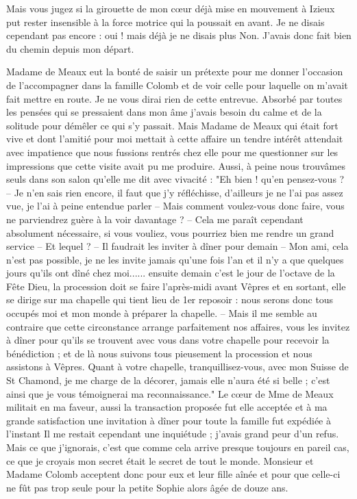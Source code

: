 \documentclass[11pt,a4paper]{report}
\begin{document}
Mais vous jugez si la girouette de mon cœur déjà mise en mouvement à Izieux put rester insensible à la force motrice qui la poussait en avant. Je ne disais cependant pas encore : oui ! mais déjà je ne disais plus Non. J'avais donc fait bien du chemin depuis mon départ.

Madame de Meaux eut la bonté de saisir un prétexte pour me donner l'occasion de l'accompagner dans la famille Colomb et de voir celle pour laquelle on m'avait fait mettre en route. Je ne vous dirai rien de cette entrevue. Absorbé par toutes les pensées qui se pressaient dans mon âme j'avais besoin du calme et de la solitude pour démêler ce qui s'y passait. Mais Madame de Meaux qui était fort vive et dont l'amitié pour moi mettait à cette affaire un tendre intérêt attendait avec impatience que nous fussions rentrés chez elle pour me questionner sur les impressions que cette visite avait pu me produire. Aussi, à peine nous trouvâmes seuls dans son salon qu'elle me dit avec vivacité : "Eh bien ! qu'en pensez-vous ? -- Je n'en sais rien encore, il faut que j'y réfléchisse, d'ailleurs je ne l'ai pas assez vue, je l'ai à peine entendue parler -- Mais comment voulez-vous donc faire, vous ne parviendrez guère à la voir davantage ? -- Cela me paraît cependant absolument nécessaire, si vous vouliez, vous pourriez bien me rendre un grand service -- Et lequel ? -- Il faudrait les inviter à dîner pour demain -- Mon ami, cela n'est pas possible, je ne les invite jamais qu'une fois l'an et il n'y a que quelques jours qu'ils ont dîné chez moi...... ensuite demain c'est le jour de l'octave de la Fête Dieu, la procession doit se faire l'après-midi avant Vêpres et en sortant, elle se dirige sur ma chapelle qui tient lieu de 1er reposoir : nous serons donc tous occupés moi et mon monde à préparer la chapelle. -- Mais il me semble au contraire que cette circonstance arrange parfaitement nos affaires, vous les invitez à dîner pour qu'ils se trouvent avec vous dans votre chapelle pour recevoir la bénédiction ; et de là nous suivons tous pieusement la procession et nous assistons à Vêpres. Quant à votre chapelle, tranquillisez-vous, avec mon Suisse de St Chamond, je me charge de la décorer, jamais elle n'aura été si belle ; c'est ainsi que je vous témoignerai ma reconnaissance." Le cœur de Mme de Meaux militait en ma faveur, aussi la transaction proposée fut elle acceptée et à ma grande satisfaction une invitation à dîner pour toute la famille fut expédiée à l'instant Il me restait cependant une inquiétude ; j'avais grand peur d'un refus. Mais ce que j'ignorais, c'est que comme cela arrive presque toujours en pareil cas, ce que je croyais mon secret était le secret de tout le monde. Monsieur et Madame Colomb acceptent donc pour eux et leur fille aînée et pour que celle-ci ne fût pas trop seule pour la petite Sophie alors âgée de douze ans.
\end{document}
